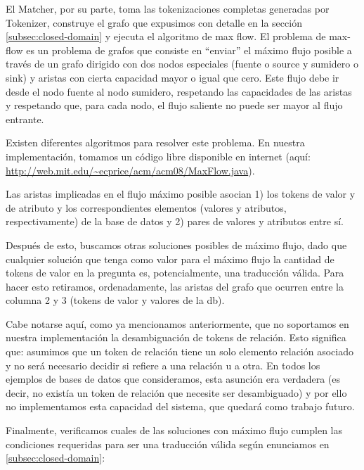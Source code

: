 El Matcher, por su parte, toma las tokenizaciones completas generadas por Tokenizer, construye el grafo que expusimos con detalle en la sección \ref{subsec:closed-domain} y ejecuta el algoritmo de max flow. El problema de max-flow es un problema de grafos que consiste en “enviar” el máximo flujo posible a través de un grafo dirigido con dos nodos especiales (fuente o source y sumidero o sink) y aristas con cierta capacidad mayor o igual que cero. Este flujo debe ir desde el nodo fuente al nodo sumidero, respetando las capacidades de las aristas y respetando que, para cada nodo, el flujo saliente no puede ser mayor al flujo entrante.

Existen diferentes algoritmos para resolver este problema. En nuestra implementación, tomamos un código libre disponible en internet (aquí: \url{http://web.mit.edu/~ecprice/acm/acm08/MaxFlow.java}).

Las aristas implicadas en el flujo máximo posible asocian 1) los tokens de valor y de atributo y los correspondientes elementos (valores y atributos, respectivamente) de la base de datos y 2) pares de valores y atributos entre sí.

Después de esto, buscamos otras soluciones posibles de máximo flujo, dado que cualquier solución que tenga como valor para el máximo flujo la cantidad de tokens de valor en la pregunta es, potencialmente, una traducción válida. Para hacer esto retiramos, ordenadamente, las aristas del grafo que ocurren entre la columna 2 y 3 (tokens de valor y valores de la db).

Cabe notarse aquí, como ya mencionamos anteriormente, que no soportamos en nuestra implementación la desambiguación de tokens de relación. Esto significa que: asumimos que un token de relación tiene un solo elemento relación asociado y no será necesario decidir si refiere a una relación u a otra. En todos los ejemplos de bases de datos que consideramos, esta asunción era verdadera (es decir, no existía un token de relación que necesite ser desambiguado) y por ello no implementamos esta capacidad del sistema, que quedará como trabajo futuro.

\medskip

Finalmente, verificamos cuales de las soluciones con máximo flujo cumplen las condiciones requeridas para ser una traducción válida según enunciamos en \ref{subsec:closed-domain}:

